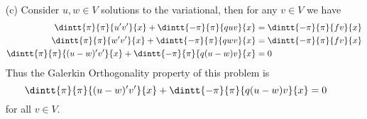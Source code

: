 \documentclass[11pt, oneside]{article}
\begin{document}
\begin{enumerate}
\begin{proof}
        Now let $u$ be a solution to the energy minimization problem, then 
        \[
          F(u) \le F(w)
        \]
        for all $w \in V$.
        Let $v \in V$ and consider $w = u + \varepsilon v$, then
        $F(u) \le F(u + \varepsilon v)$.
        Consider the function of $\varepsilon$,
        \[
          g(\varepsilon) = F(u + \varepsilon v)
        \]
        we know that $g$ has a minimum at $\varepsilon = 0$ thus $g'(0) = 0$.
        \begin{align*}
          g(\varepsilon) &= \frac{1}{2}\p{\dintt{\pi}{\pi}{(u'+\varepsilon v')^2}{x} + \dintt{-\pi}{\pi}{q(u+\varepsilon v)^2}{x}} - \dintt{-\pi}{\pi}{f(u+\varepsilon v)}{x} \\
          &= \frac{1}{2}\p{\dintt{\pi}{\pi}{(u')^2}{x} + \dintt{-\pi}{\pi}{qu^2}{x}} - \dintt{-\pi}{\pi}{fu}{x} + \varepsilon\dintt{-\pi}{\pi}{u'v'}{x} + \varepsilon\dintt{-\pi}{\pi}{quv}{x} - \varepsilon\dintt{-\pi}{\pi}{fv}{x} + \varepsilon^2\dintt{-\pi}{\pi}{(v')^2 + qv^2}{x} \\
          g'(\varepsilon) &= \dintt{-\pi}{\pi}{u'v'}{x} + \dintt{-\pi}{\pi}{quv}{x} - \dintt{-\pi}{\pi}{fv}{x} + 2\varepsilon\dintt{-\pi}{\pi}{(v')^2 + qv^2}{x} \\
          g'(0) &= \dintt{-\pi}{\pi}{u'v'}{x} + \dintt{-\pi}{\pi}{quv}{x} - \dintt{-\pi}{\pi}{fv}{x} \\
          0 &= \dintt{-\pi}{\pi}{u'v'}{x} + \dintt{-\pi}{\pi}{quv}{x} - \dintt{-\pi}{\pi}{fv}{x} \\
          \dintt{-\pi}{\pi}{fv}{x} &= \dintt{-\pi}{\pi}{u'v'}{x} + \dintt{-\pi}{\pi}{quv}{x} \\
        \end{align*}
        Since this is true for any $v \in V$, this shows that $u$ is a solution
        to the variational problem.
      \end{proof}

    \item[(c)]
      Consider $u, w \in V$ solutions to the variational, then for any $v \in V$
      we have
      \begin{align*}
        \dintt{\pi}{\pi}{u'v'}{x} + \dintt{-\pi}{\pi}{quv}{x} &= \dintt{-\pi}{\pi}{fv}{x} \\
        \dintt{\pi}{\pi}{w'v'}{x} + \dintt{-\pi}{\pi}{qwv}{x} &= \dintt{-\pi}{\pi}{fv}{x} \\
        \dintt{\pi}{\pi}{(u - w)'v'}{x} + \dintt{-\pi}{\pi}{q(u - w)v}{x} &= 0
      \end{align*}
      Thus the Galerkin Orthogonality property of this problem is
      \[
        \dintt{\pi}{\pi}{(u - w)'v'}{x} + \dintt{-\pi}{\pi}{q(u - w)v}{x} = 0
      \]
      for all $v \in V$.


\end{enumerate}
\end{document}
